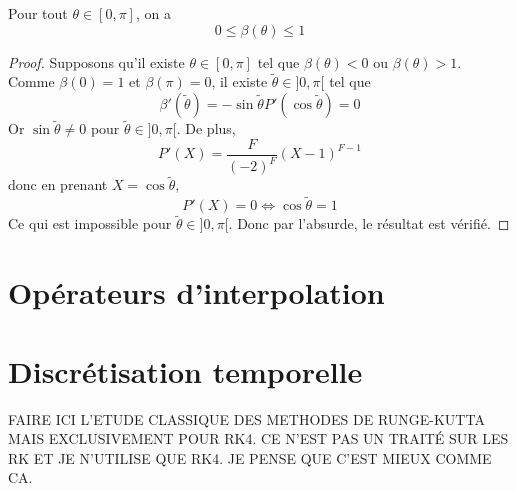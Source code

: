 \begin{proposition}
Pour tout $\theta \in [0, \pi]$, on a 
\begin{equation}
0 \leq \beta ( \theta ) \leq 1
\end{equation}
\end{proposition}

\begin{proof}
Supposons qu'il existe $\theta \in [0, \pi]$ tel que $\beta(\theta) < 0$ ou $\beta(\theta) > 1$. Comme $\beta(0)=1$ et $\beta(\pi) = 0$, il existe $\tilde{\theta} \in ]0, \pi[$ tel que 
\begin{equation}
\beta'(\tilde{\theta}) = - \sin \tilde{\theta} P'(\cos \tilde{\theta} ) = 0
\end{equation}
Or $\sin \tilde{\theta} \neq 0$ pour $\tilde{\theta} \in ]0, \pi[$.
De plus, 
\begin{equation}
P'(X) = \dfrac{F}{(-2)^F}(X-1)^{F-1}
\end{equation}
donc en prenant $X = \cos \tilde{\theta}$,
\begin{equation*}
P'(X) = 0 \Leftrightarrow \cos \tilde{\theta} = 1
\end{equation*}
Ce qui est impossible pour $\tilde{\theta} \in ]0, \pi[$. Donc par l'absurde, le résultat est vérifié.
\end{proof}














\section{Opérateurs d'interpolation}


\section{Discrétisation temporelle}


FAIRE ICI L'ETUDE CLASSIQUE DES METHODES DE RUNGE-KUTTA MAIS EXCLUSIVEMENT POUR RK4.
CE N'EST PAS UN TRAITÉ SUR LES RK ET JE N'UTILISE QUE RK4.
JE PENSE QUE C'EST MIEUX COMME CA.
